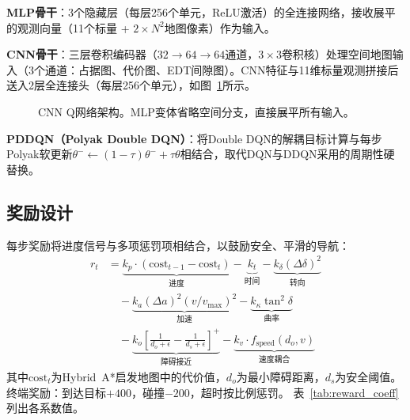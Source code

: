 \documentclass[conference]{IEEEtran}
\begin{document}
\textbf{MLP骨干}：3个隐藏层（每层256个单元，ReLU激活）的全连接网络，接收展平的观测向量（11个标量 + $2 \times N^2$地图像素）作为输入。

\textbf{CNN骨干}：三层卷积编码器（$32 \to 64 \to 64$通道，$3{\times}3$卷积核）处理空间地图输入（3个通道：占据图、代价图、EDT间隙图）。CNN特征与11维标量观测拼接后送入2层全连接头（每层256个单元），如图~\ref{fig:architecture}所示。

\begin{figure}[t]
\centering
{}
\caption{CNN Q网络架构。MLP变体省略空间分支，直接展平所有输入。}
\label{fig:architecture}
\end{figure}

\textbf{PDDQN（Polyak Double DQN）}：将Double DQN的解耦目标计算与每步Polyak软更新$\theta^- \leftarrow (1-\tau)\theta^- + \tau\theta$相结合，取代DQN与DDQN采用的周期性硬替换。

\subsection{奖励设计}\label{sec:reward}

每步奖励将进度信号与多项惩罚项相结合，以鼓励安全、平滑的导航：
\begin{align}
    r_t &= \underbrace{k_p \cdot (\text{cost}_{t-1} - \text{cost}_t)}_{\text{进度}} - \underbrace{k_t}_{\text{时间}} - \underbrace{k_\delta (\Delta\delta)^2}_{\text{转向}} \nonumber \\
    &\quad - \underbrace{k_a (\Delta a)^2 (v/v_{\max})^2}_{\text{加速}} - \underbrace{k_\kappa \tan^2\delta}_{\text{曲率}} \nonumber \\
    &\quad - \underbrace{k_o \left[\frac{1}{d_o+\epsilon} - \frac{1}{d_s+\epsilon}\right]^+}_{\text{障碍接近}} - \underbrace{k_v \cdot f_{\text{speed}}(d_o, v)}_{\text{速度耦合}} \label{eq:reward}
\end{align}
其中$\text{cost}_t$为Hybrid~A*启发地图中的代价值，$d_o$为最小障碍距离，$d_s$为安全阈值。
终端奖励：到达目标$+400$，碰撞$-200$，超时按比例惩罚。
表~\ref{tab:reward_coeff}列出各系数值。
\end{document}
